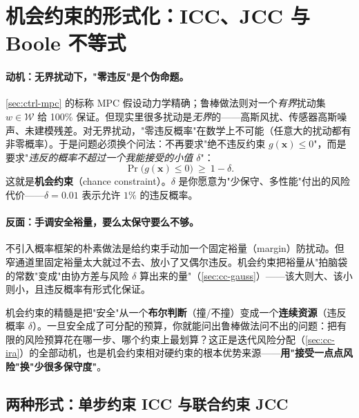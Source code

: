 \section{机会约束的形式化：ICC、JCC 与 Boole 不等式}
\label{sec:cc-form}

\paragraph{动机：无界扰动下，"零违反"是个伪命题。}
\cref{sec:ctrl-mpc} 的标称 MPC 假设动力学精确；鲁棒做法则对一个\emph{有界}扰动集 $w\in\mathcal{W}$ 给 100\% 保证。但现实里很多扰动是\emph{无界}的——高斯风扰、传感器高斯噪声、未建模残差。对无界扰动，"零违反概率"在数学上不可能（任意大的扰动都有非零概率）\cite{blackmore2011chance}。于是问题必须换个问法：不再要求"绝不违反约束 $g(\mathbf{x})\le 0$"，而是要求"\emph{违反的概率不超过一个我能接受的小值 $\delta$}"：
\begin{equation}
  \Pr\big(g(\mathbf{x})\le 0\big)\ \ge\ 1-\delta.
  \label{eq:cc-def}
\end{equation}
这就是\textbf{机会约束}（chance constraint）。$\delta$ 是你愿意为"少保守、多性能"付出的风险代价——$\delta=0.01$ 表示允许 $1\%$ 的违反概率。

\paragraph{反面：手调安全裕量，要么太保守要么不够。}
不引入概率框架的朴素做法是给约束手动加一个固定裕量（margin）防扰动。但窄通道里固定裕量太大就过不去、放小了又偶尔违反。机会约束把裕量从"拍脑袋的常数"变成"由协方差与风险 $\delta$ 算出来的量"（\cref{sec:cc-gauss}）——该大则大、该小则小，且违反概率有形式化保证。

\begin{insight}
机会约束的精髓是把"安全"从一个\textbf{布尔判断}（撞/不撞）变成一个\textbf{连续资源}（违反概率 $\delta$）。一旦安全成了可分配的预算，你就能问出鲁棒做法问不出的问题：把有限的风险预算花在哪一步、哪个约束上最划算？这正是迭代风险分配（\cref{sec:cc-ira}）的全部动机，也是机会约束相对硬约束的根本优势来源——\textbf{用"接受一点点风险"换"少很多保守度"}。
\end{insight}

\subsection{两种形式：单步约束 ICC 与联合约束 JCC}
\label{sec:cc-icc-jcc}

